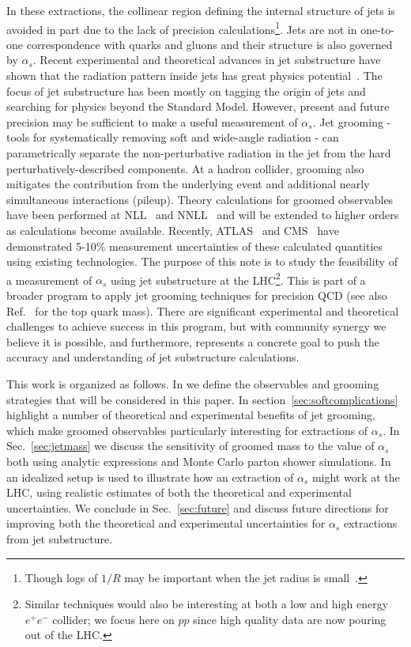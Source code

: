 In these extractions, the collinear region defining the internal
structure of jets is avoided in part due to the lack of precision calculations\footnote{Though logs of $1/R$ may be important when the jet radius is small~\cite{Dasgupta:2016bnd,Dasgupta:2014yra}.}.  Jets are not in one-to-one correspondence with
quarks and gluons and their structure is also governed by $\alpha_s$.
Recent experimental and theoretical advances in jet substructure have
shown that the radiation pattern inside jets has great physics
potential~\cite{Abdesselam:2010pt,Altheimer:2012mn,Altheimer:2013yza,Adams:2015hiv,Larkoski:2017jix}.
The focus of jet substructure has been mostly on tagging the origin of
jets and searching for physics beyond the Standard Model.  However,
present and future precision may be sufficient to make a useful
measurement of $\alpha_s$.  Jet grooming - tools for systematically
removing soft and wide-angle radiation - can parametrically separate
the non-perturbative radiation in the jet from the hard
perturbatively-described components.  At a hadron collider, grooming
also mitigates the contribution from the underlying event and
additional nearly simultaneous interactions (pileup).  Theory
calculations for groomed observables have been performed at
NLL~\cite{Marzani:2017kqd,Marzani:2017mva} and
NNLL~\cite{Frye:2016aiz,Frye:2016okc} and will be extended to higher
orders as calculations become available.  Recently,
ATLAS~\cite{Aaboud:2017qwh} and CMS~\cite{CMS-PAS-SMP-16-010} have
demonstrated 5-10\% measurement uncertainties of these calculated
quantities using existing technologies.  The purpose of this note is
to study the feasibility of a measurement of $\alpha_s$ using jet
substructure at the LHC\footnote{Similar techniques would also be
  interesting at both a low and high energy $e^+e^-$ collider; we
  focus here on $pp$ since high quality data are now pouring out of
  the LHC.}.  This is part of a broader program to apply jet grooming
techniques for precision QCD (see also Ref.~\cite{Hoang:2017kmk} for
the top quark mass).  There are significant experimental and
theoretical challenges to achieve success in this program, but with
community synergy we believe it is possible, and furthermore,
represents a concrete goal to push the accuracy and understanding of
jet substructure calculations.



This work is organized as follows. In  we define the observables and grooming strategies that will be considered in this paper. In section~\ref{sec:softcomplications} highlight a number of theoretical and experimental benefits of jet grooming, which make groomed observables particularly interesting for extractions of $\alpha_s$. In Sec.~\ref{sec:jetmass} we discuss the sensitivity of groomed mass to the value of $\alpha_s$ both using analytic expressions and Monte Carlo parton shower simulations.   In  an idealized setup is used to illustrate how an extraction of $\alpha_s$ might work at the LHC, using realistic estimates of both the theoretical and experimental uncertainties.  We conclude in Sec.~\ref{sec:future} and discuss future directions for improving both the theoretical and experimental uncertainties for $\alpha_s$ extractions from jet substructure.

